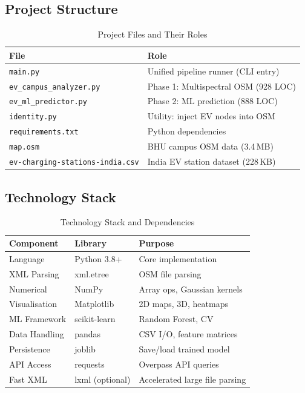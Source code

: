 \documentclass[conference]{IEEEtran}
\begin{document}
\subsection{Project Structure}

\begin{table}[htbp]
\caption{Project Files and Their Roles}
\begin{center}
\begin{tabular}{|l|l|}
\hline
\textbf{File} & \textbf{Role} \\
\hline
\texttt{main.py} & Unified pipeline runner (CLI entry) \\
\hline
\texttt{ev\_campus\_analyzer.py} & Phase 1: Multispectral OSM (928 LOC) \\
\hline
\texttt{ev\_ml\_predictor.py} & Phase 2: ML prediction (888 LOC) \\
\hline
\texttt{identity.py} & Utility: inject EV nodes into OSM \\
\hline
\texttt{requirements.txt} & Python dependencies \\
\hline
\texttt{map.osm} & BHU campus OSM data (3.4\,MB) \\
\hline
\texttt{ev-charging-stations-india.csv} & India EV station dataset (228\,KB) \\
\hline
\end{tabular}
\label{tab:project}
\end{center}
\end{table}

\subsection{Technology Stack}

\begin{table}[htbp]
\caption{Technology Stack and Dependencies}
\begin{center}
\begin{tabular}{|l|l|l|}
\hline
\textbf{Component} & \textbf{Library} & \textbf{Purpose} \\
\hline
Language & Python 3.8+ & Core implementation \\
\hline
XML Parsing & xml.etree & OSM file parsing \\
\hline
Numerical & NumPy & Array ops, Gaussian kernels \\
\hline
Visualisation & Matplotlib & 2D maps, 3D, heatmaps \\
\hline
ML Framework & scikit-learn & Random Forest, CV \\
\hline
Data Handling & pandas & CSV I/O, feature matrices \\
\hline
Persistence & joblib & Save/load trained model \\
\hline
API Access & requests & Overpass API queries \\
\hline
Fast XML & lxml (optional) & Accelerated large file parsing \\
\hline
\end{tabular}
\label{tab:tech}
\end{center}
\end{table}
\end{document}
